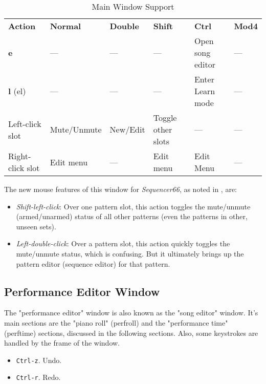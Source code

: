    \begin{table}[H]
      \centering
      \caption{Main Window Support}
      \label{table:main_window_support}
      \begin{tabular}{l l l l l l}
         \textbf{Action} & \textbf{Normal} & \textbf{Double} &
            \textbf{Shift} & \textbf{Ctrl} & \textbf{Mod4} \\
         \textbf{e} & --- & --- & --- & Open song editor & --- \\
         \textbf{l} (el) & --- & --- & --- & Enter Learn mode & --- \\
         Left-click slot & Mute/Unmute & New/Edit & Toggle other slots &
            --- & --- \\
         Right-click slot & Edit menu & --- & Edit menu & Edit Menu &
            --- \\
      \end{tabular}
   \end{table}

   The new mouse features of this window for \textsl{Sequencer66},
   as noted in , are:

   \begin{itemize}
      \item \textsl{Shift-left-click}:
         Over one pattern slot, this action toggles the mute/unmute
         (armed/unarmed) status of all other patterns
         (even the patterns in other, unseen sets).
      \item \textsl{Left-double-click}:
         Over a pattern slot, this action quickly toggles the mute/unmute status,
         which is confusing.  But it ultimately brings up the pattern editor
         (sequence editor) for that pattern.
   \end{itemize}

\subsection{Performance Editor Window}
\label{subsec:kbd_mouse_performance_editor_window}

   The "performance editor" window is also known as the "song editor" window.
   It's main sections are the "piano roll" (perfroll) and the "performance
   time" (perftime) sections, discussed in the following sections.
   Also, some keystrokes are handled by the frame of the window.

   \begin{itemize}
      \item \texttt{Ctrl-z}. Undo.
      \item \texttt{Ctrl-r}. Redo.
   \end{itemize}

